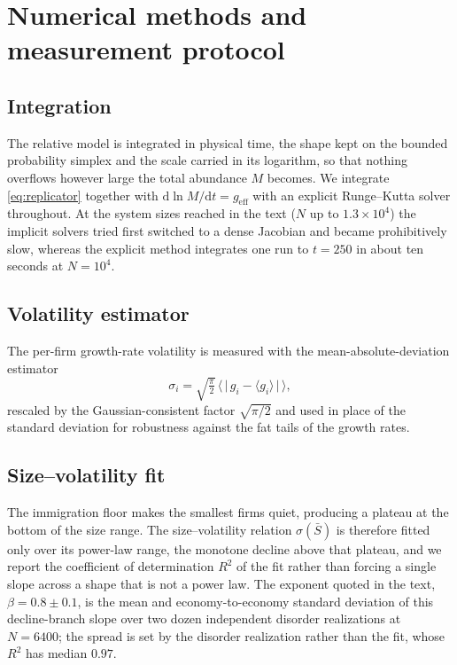 \chapter{Numerical methods and measurement protocol}
\label{app:numerics}

\section{Integration}

The relative model is integrated in physical time, the shape kept on the bounded
probability simplex and the scale carried in its logarithm, so that nothing overflows
however large the total abundance $M$ becomes. We integrate \eqref{eq:replicator}
together with $\mathrm{d}\ln M/\mathrm{d}t = g_{\mathrm{eff}}$ with an explicit
Runge--Kutta solver throughout. At the system sizes reached in the text ($N$ up to
$1.3\times10^4$) the implicit solvers tried first switched to a dense Jacobian and became
prohibitively slow, whereas the explicit method integrates one run to $t = 250$ in about
ten seconds at $N = 10^4$.

\section{Volatility estimator}

The per-firm growth-rate volatility is measured with the mean-absolute-deviation
estimator
\begin{equation}
    \sigma_i = \sqrt{\tfrac{\pi}{2}}\,\big\langle\, \big|\,g_i - \langle g_i\rangle\,\big| \,\big\rangle ,
\end{equation}
rescaled by the Gaussian-consistent factor $\sqrt{\pi/2}$ and used in place of the
standard deviation for robustness against the fat tails of the growth rates.

\section{Size--volatility fit}

The immigration floor makes the smallest firms quiet, producing a plateau at the bottom
of the size range. The size--volatility relation $\sigma(\bar S)$ is therefore fitted
only over its power-law range, the monotone decline above that plateau, and we report the
coefficient of determination $R^2$ of the fit rather than forcing a single slope across a
shape that is not a power law. The exponent quoted in the text, $\beta = 0.8 \pm 0.1$, is the
mean and economy-to-economy standard deviation of this decline-branch slope over two dozen
independent disorder realizations at $N = 6400$; the spread is set by the disorder
realization rather than the fit, whose $R^2$ has median $0.97$.

